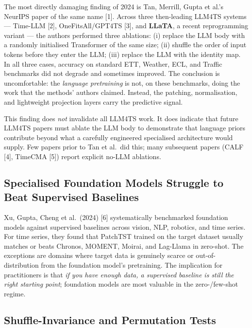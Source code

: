 The most directly damaging finding of 2024 is Tan, Merrill, Gupta et al.'s NeurIPS paper of the same name {[}1{]}. Across three then-leading LLM4TS systems --- Time-LLM {[}2{]}, OneFitsAll/GPT4TS {[}3{]}, and \textbf{LLaTA}, a recent reprogramming variant --- the authors performed three ablations: (i) replace the LLM body with a randomly initialised Transformer of the same size; (ii) shuffle the order of input tokens before they enter the LLM; (iii) replace the LLM with the identity map. In all three cases, accuracy on standard ETT, Weather, ECL, and Traffic benchmarks did not degrade and sometimes improved. The conclusion is uncomfortable: the \emph{language pretraining} is not, on these benchmarks, doing the work that the methods' authors claimed. Instead, the patching, normalisation, and lightweight projection layers carry the predictive signal.

This finding does \emph{not} invalidate all LLM4TS work. It does indicate that future LLM4TS papers must ablate the LLM body to demonstrate that language priors contribute beyond what a carefully engineered specialised architecture would supply. Few papers prior to Tan et al.~did this; many subsequent papers (CALF {[}4{]}, TimeCMA {[}5{]}) report explicit no-LLM ablations.

\subsection{Specialised Foundation Models Struggle to Beat Supervised Baselines}\label{specialised-foundation-models-struggle-to-beat-supervised-baselines}

Xu, Gupta, Cheng et al.~(2024) {[}6{]} systematically benchmarked foundation models against supervised baselines across vision, NLP, robotics, and time series. For time series, they found that PatchTST trained on the target dataset usually matches or beats Chronos, MOMENT, Moirai, and Lag-Llama in zero-shot. The exceptions are domains where target data is genuinely scarce or out-of-distribution from the foundation model's pretraining. The implication for practitioners is that \emph{if you have enough data, a supervised baseline is still the right starting point}; foundation models are most valuable in the zero-/few-shot regime.

\subsection{Shuffle-Invariance and Permutation Tests}\label{shuffle-invariance-and-permutation-tests}

